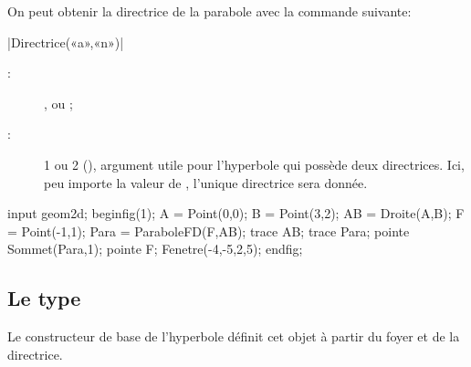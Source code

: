 \documentclass[a4paper,french]{article}
\begin{document}
On peut obtenir la directrice de la parabole avec la commande suivante:

\begin{colourband}
\macro|Directrice(«a»,«n»)|
\begin{description}
  \item[:]  ,  ou 
  ; 
  \item[:]  1 ou 2 (), argument utile pour l'hyperbole
  qui possède deux directrices. Ici, peu importe la valeur de ,
  l'unique directrice sera donnée.
\end{description}
\end{colourband}
\bigskip

\begin{ExempleMP}
input geom2d;
beginfig(1);
A = Point(0,0);
B = Point(3,2);
AB = Droite(A,B);
F = Point(-1,1);
Para = ParaboleFD(F,AB);
trace AB;
trace Para;
pointe Sommet(Para,1);
pointe F;
Fenetre(-4,-5,2,5);
endfig;
\end{ExempleMP}


\subsection{Le type }

Le constructeur de base de l'hyperbole définit cet objet à partir du foyer et
de la directrice. 
\end{document}
